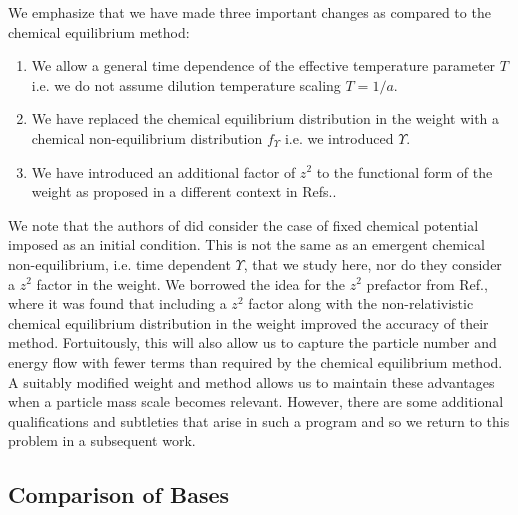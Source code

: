 We emphasize that we have made three important changes as compared to  the chemical equilibrium method:
\begin{enumerate}
\item  We allow a general time dependence of the effective temperature parameter $T$ i.e. we do not assume dilution temperature scaling $T=1/a$.
\item We have replaced the chemical  equilibrium distribution in the weight   with a chemical non-equilibrium distribution  $f_\Upsilon $ i.e. we introduced $\Upsilon$.
\item We have introduced an additional factor of $z^2$ to the functional form of the weight as proposed in a different context in Refs.\cite{Wilkening,Wilkening2}. 
\end{enumerate} 
We note that the authors of \cite{Esposito2000} did consider the case of fixed chemical potential imposed as an initial condition. This is not the same as an emergent chemical non-equilibrium, i.e. time dependent $\Upsilon$, that we study here, nor do they consider a $z^2$ factor in the weight. We borrowed the idea for the $z^2$ prefactor from   Ref.\cite{Wilkening2}, where it was found that including a $z^2$ factor along with the non-relativistic chemical equilibrium distribution in the weight improved the accuracy of their method. Fortuitously,  this will also allow us to capture the particle number and energy flow with fewer terms than required by the chemical equilibrium method. A suitably modified weight and method allows us to maintain  these advantages when a particle mass scale becomes relevant. However, there are some additional qualifications and subtleties that arise in such a program and so we return to this problem in a subsequent work.

\subsection{Comparison of Bases}\label{basis_comparison}

